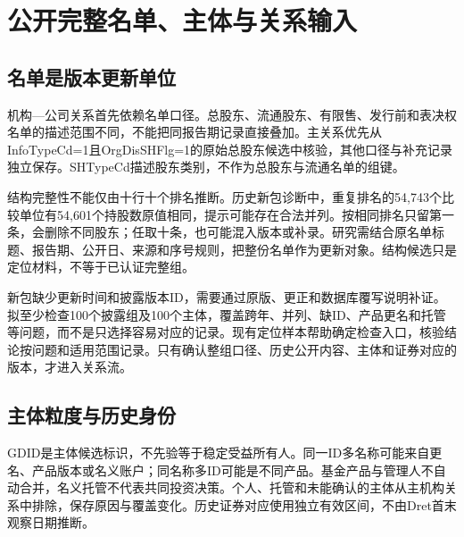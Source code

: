 \section{公开完整名单、主体与关系输入}
\subsection{名单是版本更新单位}
机构—公司关系首先依赖名单口径。总股东、流通股东、有限售、发行前和表决权名单的描述范围不同，不能把同报告期记录直接叠加。主关系优先从InfoTypeCd=1且OrgDisSHFlg=1的原始总股东候选中核验，其他口径与补充记录独立保存。SHTypeCd描述股东类别，不作为总股东与流通名单的组键。

结构完整性不能仅由十行十个排名推断。历史新包诊断中，重复排名的54,743个比较单位有54,601个持股数原值相同，提示可能存在合法并列。按相同排名只留第一条，会删除不同股东；任取十条，也可能混入版本或补录。研究需结合原名单标题、报告期、公开日、来源和序号规则，把整份名单作为更新对象。结构候选只是定位材料，不等于已认证完整组。


新包缺少更新时间和披露版本ID，需要通过原版、更正和数据库覆写说明补证。拟至少检查100个披露组及100个主体，覆盖跨年、并列、缺ID、产品更名和托管等问题，而不是只选择容易对应的记录。现有定位样本帮助确定检查入口，核验结论按问题和适用范围记录。只有确认整组口径、历史公开内容、主体和证券对应的版本，才进入关系流。

\subsection{主体粒度与历史身份}
GDID是主体候选标识，不先验等于稳定受益所有人。同一ID多名称可能来自更名、产品版本或名义账户；同名称多ID可能是不同产品。基金产品与管理人不自动合并，名义托管不代表共同投资决策。个人、托管和未能确认的主体从主机构关系中排除，保存原因与覆盖变化。历史证券对应使用独立有效区间，不由Dret首末观察日期推断。


